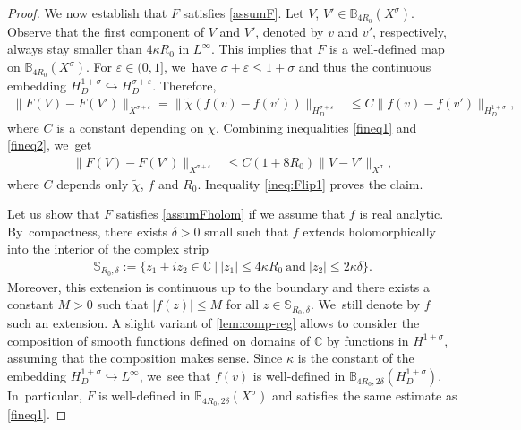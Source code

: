 \documentclass[JEP,XML,SOM,Unicode,published]{cedram}
\theoremstyle{definition}
\let\veps\varepsilon
\providecommand{\norm}[1]{\lVert#1\rVert}
\begin{document}
\begin{proof}
We now establish that $F$ satisfies \cref{assumF}. Let $V$, $V'\in \mathbb{B}_{4R_0}(X^\sigma)$. Observe that the first component of $V$ and $V'$, denoted by $v$ and $v'$, respectively, always stay smaller than $4\kappa R_0$ in $L^{\infty}$. This implies that $F$ is a well-defined map on $\mathbb{B}_{4R_0}(X^\sigma)$. For $\veps\in (0, 1]$, we~have $\sigma+\veps\leq 1+\sigma$ and thus the continuous embedding $H_D^{1+\sigma}\hookrightarrow H_D^{\sigma+\veps}$. Therefore,
\begin{align}\label{fineq2}
\norm{F(V)-F(V')}_{X^{\sigma+\veps}}=\norm{\widetilde{\chi}(f(v)-f(v'))}_{H_D^{\sigma+\veps}}&\leq C\norm{f(v)-f(v')}_{H_D^{1+\sigma}},
\end{align}
where $C$ is a constant depending on $\chi$. Combining inequalities \eqref{fineq1} and \eqref{fineq2}, we~get
\begin{align}\label{ineq:Flip1}
\norm{F(V)-F(V')}_{X^{\sigma+\veps}}&\leq C(1+8R_0)\norm{V-V'}_{X^\sigma},
\end{align}
where $C$ depends only $\widetilde{\chi}$, $f$ and $R_0$. Inequality \eqref{ineq:Flip1} proves the claim.

Let us show that $F$ satisfies \cref{assumFholom} if we assume that $f$ is real analytic. By~compactness, there exists $\delta>0$ small such that $f$ extends holomorphically into the interior of the complex strip
\begin{align*}
\mathbb{S}_{R_0, \delta}:=\{z_1+iz_2\in \mathbb{C}\ |\ |z_1|\leq 4\kappa R_0\ \text{and}\ |z_2|\leq 2\kappa \delta\}.
\end{align*}
Moreover, this extension is continuous up to the boundary and there exists a constant $M>0$ such that $|f(z)|\leq M$ for all $z\in \mathbb{S}_{R_0, \delta}$. We~still denote by $f$ such an extension. A slight variant of \cref{lem:comp-reg} allows to consider the composition of smooth functions defined on domains of $\mathbb{C}$ by functions in $H^{1+\sigma}$, assuming that the composition makes sense. Since $\kappa$ is the constant of the embedding $H_D^{1+\sigma}\hookrightarrow L^\infty$, we~see that $f(v)$ is well-defined in $\mathbb{B}_{4R_0, 2\delta}(H^{1+\sigma}_D)$. In~particular, $F$ is well-defined in $\mathbb{B}_{4R_0, 2\delta}(X^\sigma)$ and satisfies the same estimate as \eqref{fineq1}.


\end{proof}
\end{document}
